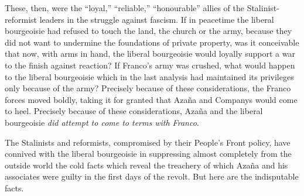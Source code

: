 These, then, were the ``loyal,'' ``reliable,'' ``honourable'' allies of the Stalinist-reformist leaders in the struggle against fascism. If in peacetime the liberal bourgeoisie had refused to touch the land, the church or the army, because they did not want to undermine the foundations of private property, was it conceivable that now, with arms in hand, the liberal bourgeoisie would loyally support a war to the finish against reaction? If Franco’s army was crushed, what would happen to the liberal bourgeoisie which in the last analysis had maintained its privileges only because of the army? Precisely because of these considerations, the Franco forces moved boldly, taking it for granted that Azaña and Companys would come to heel. Precisely because of these considerations, Azaña and the liberal bourgeoisie \emph{did attempt to come to terms with Franco}.

The Stalinists and reformists, compromised by their People’s Front policy, have connived with the liberal bourgeoisie in suppressing almost completely from the outside world the cold facts which reveal the treachery of which Azaña and his associates were guilty in the first days of the revolt. But here are the indisputable facts.

